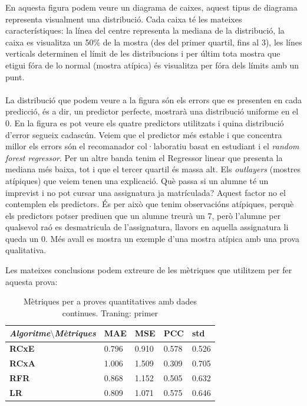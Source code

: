 \documentclass[12pt,a4paper,catalan]{article}
\begin{document}
En aquesta figura podem veure un diagrama de caixes, aquest tipus de diagrama representa visualment una distribució. Cada caixa té les mateixes característiques: la línea del centre representa la mediana de la distribució, la caixa es visualitza un 50\% de la mostra (des del primer quartil, fins al 3), les línes verticals determinen el límit de les distribucions i per últim tota mostra que etigui fóra de lo normal (mostra atípica) és visualitza per fóra dels límits amb un punt.
\\
\\
La distribució que podem veure a la figura són els errors que es presenten en cada predicció, és a dir, un predictor perfecte, mostrarà una distribució uniforme en el 0. En la figura es pot veure els quatre predictors utilitzats i quina distribució d'error segueix cadascún. Veiem que el predictor més estable i que concentra millor els errors són el recomanador col·laboratiu basat en estudiant i el \textit{random forest regressor}. Per un altre banda tenim el Regressor linear que presenta la mediana més baixa, tot i que el tercer quartil és massa alt. Els \textit{outlayers}  (mostres atípiques) que veiem tenen una explicació. Què passa si un alumne té un imprevist i no pot cursar una assignatura ja matrículada? Aquest factor no el contemplen els predictors. És per això que tenim observacións atípiques, perquè els predictors potser prediuen que un alumne treurà un 7, però l'alumne per qualsevol raó es desmatricula de l'assignatura, llavors en aquella assignatura li queda un 0. Més avall es mostra un exemple d'una mostra atípica amb una prova qualitativa.

Les mateixes conclusions podem extreure de les mètriques que utilitzem per fer aquesta prova:

\begin{table}[h]
\centering
\begin{tabular}{lllll}
\hline
\textit{\textbf{Algoritme$\setminus$Mètriques}} & \textbf{MAE} & \textbf{MSE} & \textbf{PCC} & \textbf{std} \\ \hline
\textbf{RCxE}          & 0.796          & 0.910          & 0.578          & 0.526          \\
\textbf{RCxA}          & 1.006          & 1.509          & 0.309          & 0.705          \\
\textbf{RFR}           & 0.868          & 1.152          & 0.505          & 0.632          \\
\textbf{LR}            & 0.809          & 1.071          & 0.575          & 0.646          \\ \hline
\end{tabular}
\caption{Mètriques per a proves quantitatives amb dades continues. Traning: primer}
\end{table}
\end{document}
